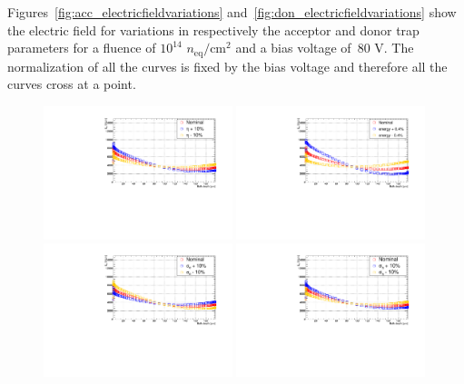 Figures~\ref{fig:acc_electricfieldvariations} and~\ref{fig:don_electricfieldvariations} show the electric field for variations in respectively the acceptor and donor trap parameters for a fluence of $10^{14}$ $n_\text{eq}/\text{cm}^2$ and a bias voltage of~80 V.  The normalization of all the curves is fixed by the bias voltage and therefore all the curves cross at a point. 


\begin{figure}[htpb!]
\centering
\includegraphics[width=0.49\textwidth]{new_Aetavariation.pdf}
\includegraphics[width=0.49\textwidth]{new_Aenergyvariation.pdf}
\includegraphics[width=0.49\textwidth]{new_Asigmaevariation.pdf}
\includegraphics[width=0.49\textwidth]{new_Asigmahvariation.pdf}

\end{figure}
